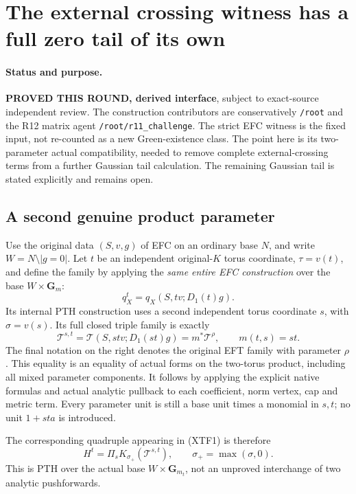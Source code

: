 \section{The external crossing witness has a full zero tail of its own}
\label{sec:r12-external-crossing-witness-tail}

\paragraph{Status and purpose.}
\textbf{PROVED THIS ROUND, derived interface}, subject to exact-source
independent review.  The construction contributors are conservatively
\texttt{/root} and the R12 matrix agent
\texttt{/root/r11\_challenge}.  The strict EFC witness is the fixed
input, not re-counted as a new Green-existence class.  The point here
is its two-parameter actual compatibility, needed to remove complete
external-crossing terms from a further Gaussian tail calculation.
The remaining Gaussian tail is stated explicitly and remains open.

\subsection{A second genuine product parameter}

Use the original data $(S,v,g)$ of EFC on an ordinary base $N$,
and write $W=N\setminus|g=0|$.  Let $t$ be an independent original-$K$
torus coordinate, $\tau=v(t)$, and define the family by applying the
\emph{same entire EFC construction} over the base $W\times\mathbf G_m$:
\[
       q_X^t=q_X(S,tv;D_1(t)g).
 \tag{XTF1}
\]
Its internal PTH construction uses a second independent torus
coordinate $s$, with $\sigma=v(s)$.  Its full closed triple family
is exactly
\[
 \mathcal T^{s,t}
       =\mathcal T(S,st v;D_1(st)g)
       =m^*\mathcal T^\rho,
 \qquad m(t,s)=st.
 \tag{XTF2}
\]
The final notation on the right denotes the original EFT family with
parameter $\rho$.  This equality is an equality of actual forms on
the two-torus product, including all mixed parameter components.
It follows by applying the explicit native formulas and actual
analytic pullback to each coefficient, norm vertex, cap and metric
term.  Every parameter unit is still a base unit times a monomial
in $s,t$; no unit $1+st a$ is introduced.

The corresponding quadruple appearing in (XTF1) is therefore
\[
          H^t=\Pi_s K_{\sigma_+}(\mathcal T^{s,t}),
                    \qquad \sigma_+=\max(\sigma,0).
 \tag{XTF3}
\]
This is PTH over the actual base $W\times\mathbf G_m_t$, not an
unproved interchange of two analytic pushforwards.

